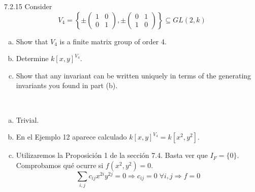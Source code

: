 \documentclass[twoside]{article}
\begin{document}
\newpage
\begin{ejercicio}{7.2.15}
Consider
\[
V_4 =\left\{\pm\begin{pmatrix}
1 & 0\\
0 & 1
\end{pmatrix},\pm\begin{pmatrix}
0 & 1\\
1 & 0
\end{pmatrix}\right\}\subseteq GL(2, k)
\]
\begin{enumerate}[a.]
\item Show that $V_4$ is a finite matrix group of order 4.
\item Determine $k[x, y]^{V_4}$.
\item Show that any invariant can be written uniquely in terms of the generating invariants
you found in part (b).
\end{enumerate}
\end{ejercicio}
\begin{solucion}\
\begin{enumerate}[a.]
\item Trivial.
\item En el Ejemplo 12 aparece calculado $k[x, y]^{V_4}=k[x^2,y^2]$. 
\item Utilizaremos la Proposición 1 de la sección 7.4. Basta ver que $I_F = \{0\}$. Comprobamos qué ocurre si $f(x^2,y^2)=0$. 
$$
\sum_{i,j}c_{ij} x^{2i}y^{2j} = 0 \Rightarrow c_{ij} = 0 \; \forall i,j \Rightarrow f = 0
$$
\end{enumerate}
\end{solucion}
\end{document}

